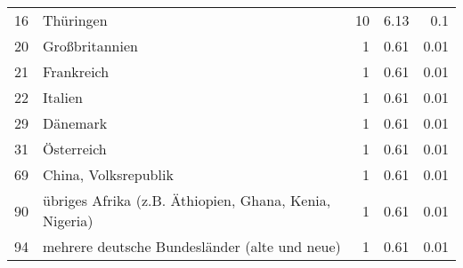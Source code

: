 \begin{longtable}{lXrrr}
        16 & \multicolumn{1}{X}{Thüringen} & %
          \num{10} &
          \num[round-mode=places,round-precision=2]{6.13} &
          \num[round-mode=places,round-precision=2]{0.1} \\

        20 & \multicolumn{1}{X}{Großbritannien} & %
          \num{1} &
          \num[round-mode=places,round-precision=2]{0.61} &
          \num[round-mode=places,round-precision=2]{0.01} \\

        21 & \multicolumn{1}{X}{Frankreich} & %
          \num{1} &
          \num[round-mode=places,round-precision=2]{0.61} &
          \num[round-mode=places,round-precision=2]{0.01} \\

        22 & \multicolumn{1}{X}{Italien} & %
          \num{1} &
          \num[round-mode=places,round-precision=2]{0.61} &
          \num[round-mode=places,round-precision=2]{0.01} \\

        29 & \multicolumn{1}{X}{Dänemark} & %
          \num{1} &
          \num[round-mode=places,round-precision=2]{0.61} &
          \num[round-mode=places,round-precision=2]{0.01} \\

        31 & \multicolumn{1}{X}{Österreich} & %
          \num{1} &
          \num[round-mode=places,round-precision=2]{0.61} &
          \num[round-mode=places,round-precision=2]{0.01} \\

        69 & \multicolumn{1}{X}{China, Volksrepublik} & %
          \num{1} &
          \num[round-mode=places,round-precision=2]{0.61} &
          \num[round-mode=places,round-precision=2]{0.01} \\

        90 & \multicolumn{1}{X}{übriges Afrika (z.B. Äthiopien, Ghana, Kenia, Nigeria)} & %
          \num{1} &
          \num[round-mode=places,round-precision=2]{0.61} &
          \num[round-mode=places,round-precision=2]{0.01} \\

        94 & \multicolumn{1}{X}{mehrere deutsche Bundesländer (alte und neue)} & %
          \num{1} &
          \num[round-mode=places,round-precision=2]{0.61} &
          \num[round-mode=places,round-precision=2]{0.01} \\


\end{longtable}
